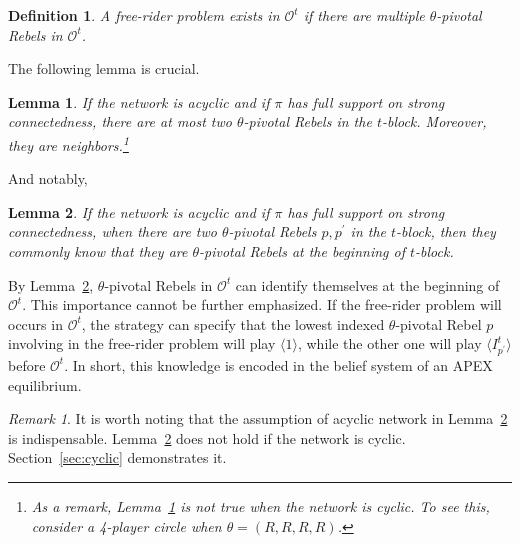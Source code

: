 \documentclass[12pt,letter]{article}
\newcommand{\Omicron}{\mathcal{O}}
\newtheorem{lemma}{Lemma}[section]
\newtheorem{definition}{Definition}[section]
\theoremstyle{definition}
\theoremstyle{remark}
\newtheorem*{remark}{Remark}
\theoremstyle{claim}
\begin{document}
\begin{definition}
A free-rider problem exists in $\Omicron^t$ if there are multiple $\theta$-pivotal Rebels in $\Omicron^t$.
\end{definition}



The following lemma is crucial. 
\begin{lemma}
\label{lemma_at_most_two_nodes}
If the network is acyclic and if $\pi$ has full support on strong connectedness, there are at most two $\theta$-pivotal Rebels in the $t$-block. Moreover, they are neighbors.\footnote{As a remark, Lemma~\ref{lemma_at_most_two_nodes} is not true when the network is cyclic. To see this, consider a 4-player circle when $\theta=(R,R,R,R)$.}
\end{lemma}

And notably,

\begin{lemma}
\label{lemman_pivotals_CK}
If the network is acyclic and if $\pi$ has full support on strong connectedness, when there are two $\theta$-pivotal Rebels $p,p^{'}$ in the $t$-block, then they commonly know that they are $\theta$-pivotal Rebels at the beginning of $t$-block.
\end{lemma}

By Lemma~\ref{lemman_pivotals_CK}, $\theta$-pivotal Rebels in $\Omicron^t$ can identify themselves at the beginning of $\Omicron^t$. This importance cannot be further emphasized. If the free-rider problem will occurs in $\Omicron^t$, the strategy can specify that the lowest indexed $\theta$-pivotal Rebel $p$ involving in the free-rider problem will play $\langle 1 \rangle$, while the other one will play $\langle I^t_{p^{'}} \rangle$ before $\Omicron^t$. In short, this knowledge is encoded in the belief system of an APEX equilibrium. 

\begin{remark}
It is worth noting that the assumption of acyclic network in Lemma~\ref{lemman_pivotals_CK} is indispensable. Lemma~\ref{lemman_pivotals_CK} does not hold if the network is cyclic. Section~\ref{sec:cyclic} demonstrates it.
\end{remark}
\end{document}
